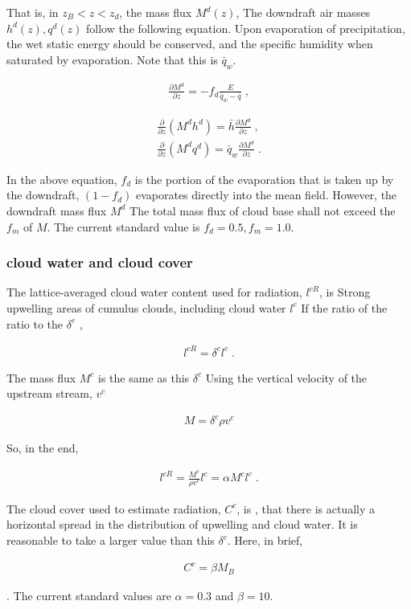 That is, in \(z_B < z < z_d\), the mass flux \(M^d(z)\), The downdraft
air masses \(h^d(z),q^d(z)\) follow the following equation. Upon
evaporation of precipitation, the wet static energy should be conserved,
and the specific humidity when saturated by evaporation. Note that this
is \(\bar{q}_{w}\).

\begin{eqnarray}
  \frac{\partial M^d}{\partial z} =  - f_d \frac{E}{\bar{q}_{w}-\bar{q}} \;  ,
\end{eqnarray}

\begin{eqnarray}
  \frac{\partial }{\partial z} ( M^d h^d )  =  \bar{h}     \frac{\partial M^d}{\partial z} \; ,\\
  \frac{\partial }{\partial z} ( M^d q^d )  =  \bar{q}_{w} \frac{\partial M^d}{\partial z} \; .
\end{eqnarray}

In the above equation, \(f_d\) is the portion of the evaporation that is
taken up by the downdraft, \((1-f_d)\) evaporates directly into the mean
field. However, the downdraft mass flux \(M^d\) The total mass flux of
cloud base shall not exceed the \(f_m\) of \(M\). The current standard
value is \(f_d=0.5, f_m=1.0\).

\hypertarget{cloud-water-and-cloud-cover}{%
\subsubsection{cloud water and cloud
cover}\label{cloud-water-and-cloud-cover}}

The lattice-averaged cloud water content used for radiation, \(l^{cR}\),
is Strong upwelling areas of cumulus clouds, including cloud water
\(l^c\) If the ratio of the ratio to the \(\delta^c\) ,

\begin{eqnarray}
  l^{cR} = \delta^c l^c \; .
\end{eqnarray}

The mass flux \(M^c\) is the same as this \(\delta^c\) Using the
vertical velocity of the upstream stream, \(v^c\)

\begin{eqnarray}
  M = \delta^c \rho v^c 
\end{eqnarray}

So, in the end,

\begin{eqnarray}
  l^{cR} = \frac{M^c}{\rho v^c} l^c = \alpha M^c l^c \; .
\end{eqnarray}

The cloud cover used to estimate radiation, \(C^c\), is , that there is
actually a horizontal spread in the distribution of upwelling and cloud
water. It is reasonable to take a larger value than this \(\delta^c\).
Here, in brief,

\begin{eqnarray}
  C^c = \beta M_B
\end{eqnarray}

. The current standard values are \(\alpha=0.3\) and \(\beta=10\).
